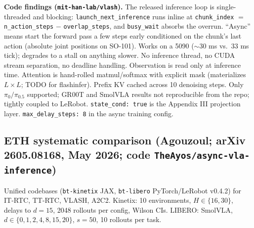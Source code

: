 \documentclass[10pt,letterpaper]{article}
\begin{document}
\textbf{Code findings (\texttt{mit-han-lab/vlash}).}\label{sec:vlashcode} The released inference loop is single-threaded and blocking: \texttt{launch\_next\_inference} runs inline at \texttt{chunk\_index} $=$ \texttt{n\_action\_steps} $-$ \texttt{overlap\_steps}, and \texttt{busy\_wait} absorbs the overrun. ``Async'' means start the forward pass a few steps early conditioned on the chunk's last action (absolute joint positions on SO-101). Works on a 5090 ($\sim$30 ms vs.\ 33 ms tick); degrades to a stall on anything slower. No inference thread, no CUDA stream separation, no deadline handling. Observation is read only at inference time. Attention is hand-rolled matmul/softmax with explicit mask (materializes $L\times L$; TODO for flashinfer). Prefix KV cached across 10 denoising steps. Only $\pi_0/\pi_{0.5}$ supported; GR00T and SmolVLA results not reproducible from the repo; tightly coupled to LeRobot. \texttt{state\_cond: true} is the Appendix III projection layer. \texttt{max\_delay\_steps: 8} in the async training config.

\subsection{ETH systematic comparison (Agouzoul; arXiv 2605.08168, May 2026; code \texttt{TheAyos/async-vla-inference})}

Unified codebases (\texttt{bt-kinetix} JAX, \texttt{bt-libero} PyTorch/LeRobot v0.4.2) for IT-RTC, TT-RTC, VLASH, A2C2. Kinetix: 10 environments, $H\in\{16,30\}$, delays to $d=15$, 2048 rollouts per config, Wilson CIs. LIBERO: SmolVLA, $d\in\{0,1,2,4,8,15,20\}$, $s=50$, 10 rollouts per task.
\end{document}
